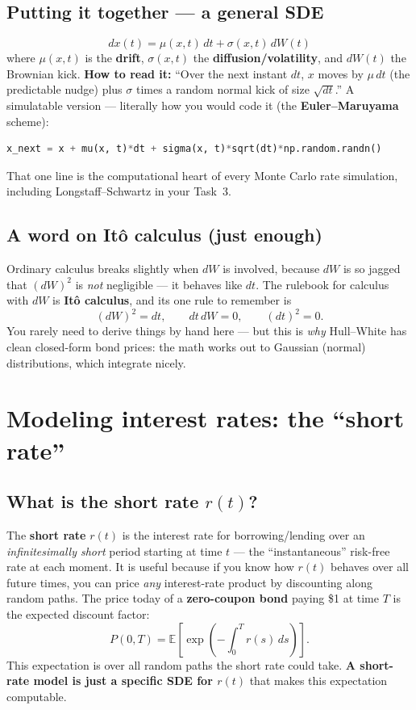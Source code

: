 \documentclass[11pt]{article}
\begin{document}
\subsection{Putting it together --- a general SDE}
\[
  dx(t) = \mu(x,t)\,dt + \sigma(x,t)\,dW(t)
\]
where $\mu(x,t)$ is the \textbf{drift}, $\sigma(x,t)$ the \textbf{diffusion/volatility},
and $dW(t)$ the Brownian kick. \textbf{How to read it:} ``Over the next instant $dt$,
$x$ moves by $\mu\,dt$ (the predictable nudge) plus $\sigma$ times a random normal kick
of size $\sqrt{dt}$.'' A simulatable version --- literally how you would code it (the
\textbf{Euler--Maruyama} scheme):

\begin{lstlisting}[language=Python]
x_next = x + mu(x, t)*dt + sigma(x, t)*sqrt(dt)*np.random.randn()
\end{lstlisting}

That one line is the computational heart of every Monte Carlo rate simulation,
including Longstaff--Schwartz in your Task~3.

\subsection{A word on It\^o calculus (just enough)}
Ordinary calculus breaks slightly when $dW$ is involved, because $dW$ is so jagged
that $(dW)^2$ is \emph{not} negligible --- it behaves like $dt$. The rulebook for
calculus with $dW$ is \textbf{It\^o calculus}, and its one rule to remember is
\[
  (dW)^2 = dt, \qquad dt\,dW = 0, \qquad (dt)^2 = 0 .
\]
You rarely need to derive things by hand here --- but this is \emph{why} Hull--White
has clean closed-form bond prices: the math works out to Gaussian (normal)
distributions, which integrate nicely.

\section{Modeling interest rates: the ``short rate''}

\subsection{What is the short rate $r(t)$?}
The \textbf{short rate} $r(t)$ is the interest rate for borrowing/lending over an
\emph{infinitesimally short} period starting at time $t$ --- the ``instantaneous''
risk-free rate at each moment. It is useful because if you know how $r(t)$ behaves over
all future times, you can price \emph{any} interest-rate product by discounting along
random paths. The price today of a \textbf{zero-coupon bond} paying \$1 at time $T$ is
the expected discount factor:
\[
  P(0,T) = \mathbb{E}\!\left[\exp\!\left(-\int_0^T r(s)\,ds\right)\right].
\]
This expectation is over all random paths the short rate could take. \textbf{A
short-rate model is just a specific SDE for $r(t)$} that makes this expectation
computable.
\end{document}

